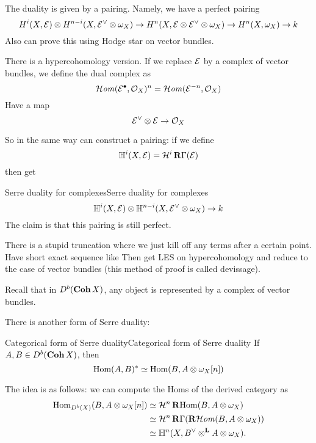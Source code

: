 The duality is given by a pairing. Namely, we have a perfect pairing$$H^i(X,\mathcal{E})\otimes H^{n-i}(X,\mathcal{E}^\vee\otimes \omega_{X})\to H^n(X, \mathcal{E}\otimes \mathcal{E}^\vee\otimes \omega_{X})\to H^n(X, \omega_{X})\to k$$
Also can prove this using Hodge star on vector bundles.

There is a hypercohomology version. If we replace $\mathcal{E}$ by a complex of vector bundles, we define the dual complex as $$\operatorname{\mathcal{H}\mathit{om}}(\mathcal{E}^\bullet,\mathcal{O}_X)^n=\operatorname{\mathcal{H}\mathit{om}}(\mathcal{E}^{-n}, \mathcal{O}_X)$$Have a map $$\mathcal{E}^\vee \otimes \mathcal{E}\to \mathcal{O}_X$$


So in the same way can construct a pairing: if we define $$\mathbb{H}^i(X,\mathcal{E})=\mathcal{H}^i\operatorname{\mathbf{R}\Gamma}(\mathcal{E})$$ then get

\begin{proposition}{Serre duality for complexes}{Serre duality for complexes}
        $$\mathbb{H}^i(X,\mathcal{E})\otimes \mathbb{H}^{n-i}(X, \mathcal{E}^\vee \otimes \omega_{X})\to k$$
The claim is that this pairing is still perfect.
\end{proposition}

There is a stupid truncation where we just kill off any terms after a certain point. Have short exact sequence like %
Then get LES on hypercohomology and reduce to the case of vector bundles (this method of proof is called devissage).

Recall that in $D^b(\operatorname{\mathbf{Coh}} X)$, any object is represented by a complex of vector bundles.

There is another form of Serre duality:

\begin{proposition}{Categorical form of Serre duality}{Categorical form of Serre duality}
    If $A,B\in D^b(\operatorname{\mathbf{Coh}} X)$, then $$\operatorname{Hom}(A,B)^*\simeq \operatorname{Hom}(B,A\otimes \omega_{X}[n])$$
\end{proposition}

The idea is as follows: we can compute the Homs of the derived category as
\begin{align*}
    \operatorname{Hom}_{D^b(X)}(B,A\otimes\omega_X[n])
        &\simeq \mathcal{H}^n\operatorname{\mathbf{R}Hom}(B,A\otimes\omega_X) \\
        &\simeq \mathcal{H}^n\operatorname{\mathbf{R}\Gamma}(\operatorname{\mathbf{R}\mathcal{H}\mathit{om}}(B,A\otimes\omega_X)) \\
        &\simeq \mathbb{H}^n(X,B^\vee\otimes^{\operatorname{\mathbf{L}}} A\otimes\omega_X).
\end{align*}


